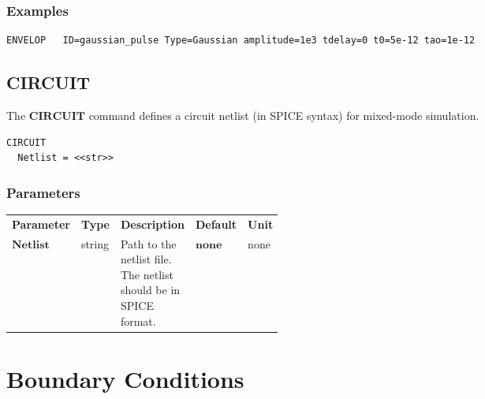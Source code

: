 \documentclass[oneside,12pt]{cgd_book}
\begin{document}
\subsubsection{Examples}
\begin{lstlisting}[style=GeniusCode]
ENVELOP   ID=gaussian_pulse Type=Gaussian amplitude=1e3 tdelay=0 t0=5e-12 tao=1e-12
\end{lstlisting}
\subsection{CIRCUIT}
The $\mathbf{CIRCUIT}$
command defines a circuit netlist (in SPICE syntax) for mixed-mode
        simulation.
\par
\begin{lstlisting}[style=GeniusCmd]
CIRCUIT
  Netlist = <<str>>
\end{lstlisting}
\par
\subsubsection{Parameters}
\begin{longtable}{ll>{\raggedright}p{0.4\linewidth}ll}
\textbf{Parameter} & \textbf{Type} & \textbf{Description} & \textbf{Default} & \textbf{Unit} \\
 $\mathbf{Netlist}$
& string
& Path to the netlist file. The netlist should be in SPICE format.
\par
& $\mathbf{none}$
& none\\
\end{longtable}
\section{Boundary Conditions}
\end{document}
